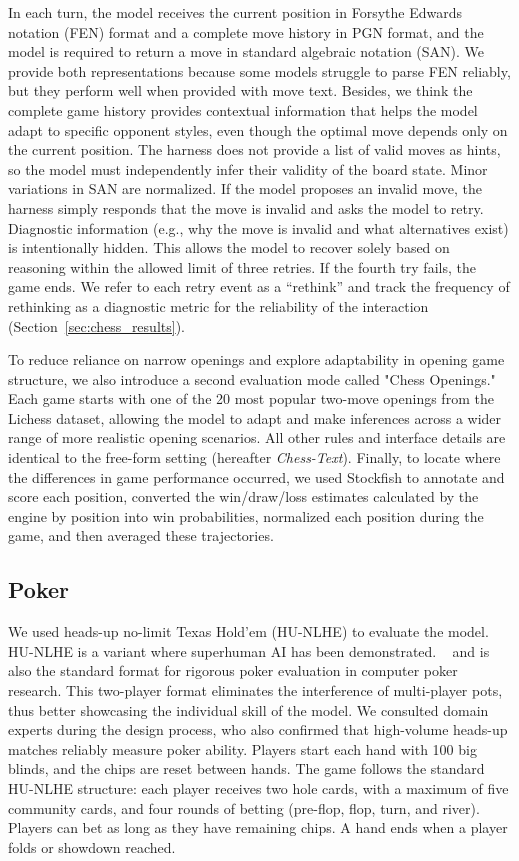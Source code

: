 \documentclass{article}
\begin{document}
In each turn, the model receives the current position in Forsythe Edwards notation (FEN) format and a complete move history in PGN format, and the model is required to return a move in standard algebraic notation (SAN). We provide both representations because some models struggle to parse FEN reliably, but they perform well when provided with move text. Besides, we think the complete game history provides contextual information that helps the model adapt to specific opponent styles, even though the optimal move depends only on the current position. The harness does not provide a list of valid moves as hints, so the model must independently infer their validity of the board state. Minor variations in SAN are normalized. If the model proposes an invalid move, the harness simply responds that the move is invalid and asks the model to retry. Diagnostic information (e.g., why the move is invalid and what alternatives exist) is intentionally hidden. This allows the model to recover solely based on reasoning within the allowed limit of three retries. If the fourth try fails, the game ends. We refer to each retry event as a “rethink” and track the frequency of rethinking as a diagnostic metric for the reliability of the interaction (Section~\ref{sec:chess_results}).

To reduce reliance on narrow openings and explore adaptability in opening game structure, we also introduce a second evaluation mode called "Chess Openings." Each game starts with one of the 20 most popular two-move openings from the Lichess dataset, allowing the model to adapt and make inferences across a wider range of more realistic opening scenarios. All other rules and interface details are identical to the free-form setting (hereafter \emph{Chess-Text}). Finally, to locate where the differences in game performance occurred, we used Stockfish to annotate and score each position, converted the win/draw/loss estimates calculated by the engine by position into win probabilities, normalized each position during the game, and then averaged these trajectories.

\subsection{Poker}
\label{sec:poker_methods}


We used heads-up no-limit Texas Hold'em (HU-NLHE) to evaluate the model. HU-NLHE is a variant where superhuman AI has been demonstrated. ~\citep{brown2018libratus} and is also the standard format for rigorous poker evaluation  in computer poker research. This two-player format eliminates the interference of multi-player pots, thus better showcasing the individual skill of the model. We consulted domain experts during the design process, who also confirmed that high-volume heads-up matches reliably measure poker ability. Players start each hand with 100 big blinds, and the chips are reset between hands. The game follows the standard HU-NLHE structure: each player receives two hole cards, with a maximum of five community cards, and four rounds of betting (pre-flop, flop, turn, and river). Players can bet as long as they have remaining chips. A hand ends when a player folds or showdown reached.
\end{document}
